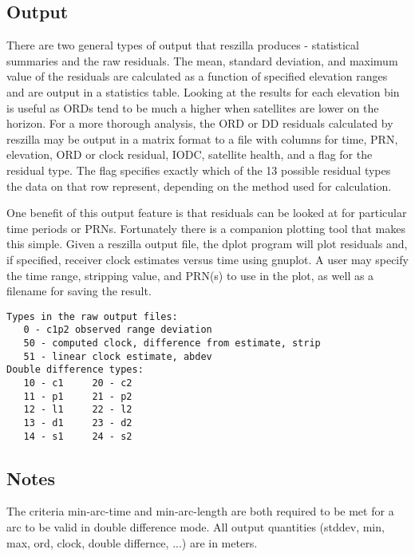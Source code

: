 \subsection{Output}
There are two general types of output that reszilla produces -
statistical summaries and the raw residuals.  The mean, standard 
deviation, and maximum value of the residuals are calculated 
as a function of specified elevation ranges and are output in a 
statistics table. Looking at the results for each elevation bin 
is useful as ORDs tend to be much a higher when satellites are 
lower on the horizon. For a more thorough analysis, the ORD or DD 
residuals calculated by reszilla may be output in a matrix format 
to a file with columns for time, PRN, elevation, ORD or clock residual, 
IODC, satellite health, and a flag for the residual type.  The flag 
specifies exactly which of the 13 possible residual types the data 
on that row represent, depending on the method used for calculation. 

One benefit of this output feature is that residuals can be looked at 
for particular time periods or PRNs. Fortunately there is a companion 
plotting tool that makes this simple. Given a reszilla output file, 
the dplot program will plot residuals and, if specified, receiver clock 
estimates versus time using gnuplot. A user may specify the time 
range, stripping value, and PRN(s) to use in the plot, as well as a
filename for saving the result. 



\begin{\outputsize}
\begin{verbatim}
Types in the raw output files:
   0 - c1p2 observed range deviation
   50 - computed clock, difference from estimate, strip
   51 - linear clock estimate, abdev
Double difference types:
   10 - c1     20 - c2
   11 - p1     21 - p2
   12 - l1     22 - l2
   13 - d1     23 - d2
   14 - s1     24 - s2
\end{verbatim}
\end{\outputsize}

\subsection{Notes}
The criteria min-arc-time and min-arc-length are both required to be met
for a arc to be valid in double difference mode.
All output quantities (stddev, min, max, ord, clock, double differnce, ...)
are in meters.

%

